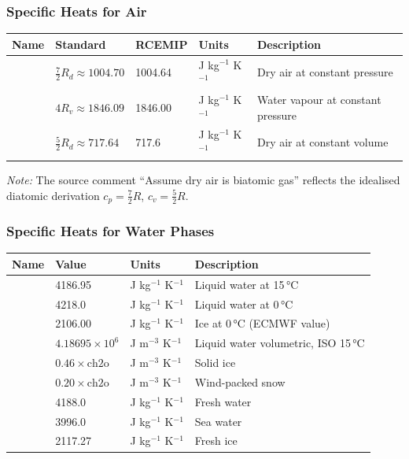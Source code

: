 \subsubsection{Specific Heats for Air}

\begin{longtable}{L{2.5cm} L{3.5cm} L{3cm} L{2cm} L{3.5cm}}
  \toprule
  \textbf{Name} & \textbf{Standard} & \textbf{RCEMIP} & \textbf{Units} & \textbf{Description} \\
  \midrule
  \endhead
  \bottomrule
  \endfoot
   & $\frac{7}{2}R_d\approx1004.70$ & 1004.64 & J kg$^{-1}$ K$^{-1}$ & Dry air at constant pressure \\
   & $4R_v\approx1846.09$           & 1846.00 & J kg$^{-1}$ K$^{-1}$ & Water vapour at constant pressure \\
   & $\frac{5}{2}R_d\approx717.64$  & 717.6   & J kg$^{-1}$ K$^{-1}$ & Dry air at constant volume \\
\end{longtable}

\textit{Note:} The source comment ``Assume dry air is biatomic gas'' reflects
the idealised diatomic derivation $c_p = \frac{7}{2}R$, $c_v = \frac{5}{2}R$.

\subsubsection{Specific Heats for Water Phases}

\begin{longtable}{L{3cm} L{3cm} L{3cm} L{5cm}}
  \toprule
  \textbf{Name} & \textbf{Value} & \textbf{Units} & \textbf{Description} \\
  \midrule
  \endhead
  \bottomrule
  \endfoot
        & 4186.95              & J kg$^{-1}$ K$^{-1}$   & Liquid water at 15\,°C \\
       & 4218.0               & J kg$^{-1}$ K$^{-1}$   & Liquid water at 0\,°C \\
        & 2106.00              & J kg$^{-1}$ K$^{-1}$   & Ice at 0\,°C (ECMWF value) \\
       & $4.18695\times10^6$  & J m$^{-3}$ K$^{-1}$    & Liquid water volumetric, ISO 15\,°C \\
      & $0.46\times\text{ch2o}$ & J m$^{-3}$ K$^{-1}$ & Solid ice \\
       & $0.20\times\text{ch2o}$ & J m$^{-3}$ K$^{-1}$ & Wind-packed snow \\
     & 4188.0               & J kg$^{-1}$ K$^{-1}$   & Fresh water \\
     & 3996.0               & J kg$^{-1}$ K$^{-1}$   & Sea water \\
    & 2117.27              & J kg$^{-1}$ K$^{-1}$   & Fresh ice \\
\end{longtable}

